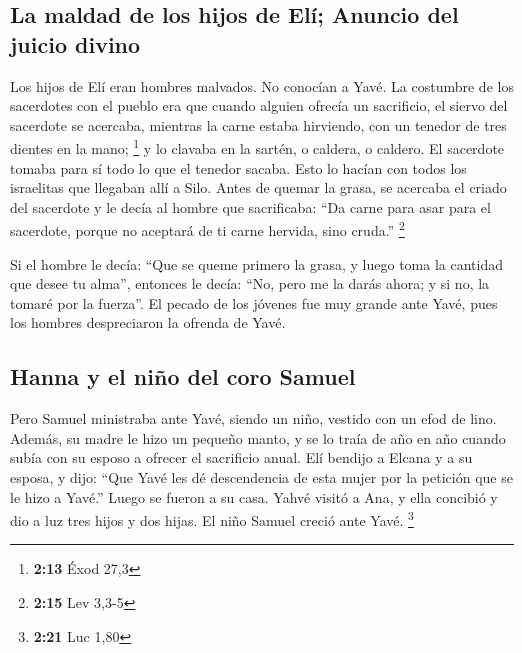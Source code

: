 \begin{paracol}{2}
\hypertarget{la-maldad-de-los-hijos-de-eluxed-anuncio-del-juicio-divino}{%
\subsection{La maldad de los hijos de Elí; Anuncio del juicio
divino}\label{la-maldad-de-los-hijos-de-eluxed-anuncio-del-juicio-divino}}

 Los hijos de Elí eran hombres malvados. No conocían a
Yavé.  La costumbre de los sacerdotes con el pueblo era
que cuando alguien ofrecía un sacrificio, el siervo del sacerdote se
acercaba, mientras la carne estaba hirviendo, con un tenedor de tres
dientes en la mano; \footnote{\textbf{2:13} Éxod 27,3}  y
lo clavaba en la sartén, o caldera, o caldero. El sacerdote tomaba para
sí todo lo que el tenedor sacaba. Esto lo hacían con todos los
israelitas que llegaban allí a Silo.  Antes de quemar la
grasa, se acercaba el criado del sacerdote y le decía al hombre que
sacrificaba: ``Da carne para asar para el sacerdote, porque no aceptará
de ti carne hervida, sino cruda.'' \footnote{\textbf{2:15} Lev 3,3-5}

 Si el hombre le decía: ``Que se queme primero la grasa,
y luego toma la cantidad que desee tu alma'', entonces le decía: ``No,
pero me la darás ahora; y si no, la tomaré por la fuerza''.
 El pecado de los jóvenes fue muy grande ante Yavé, pues
los hombres despreciaron la ofrenda de Yavé.

\hypertarget{hanna-y-el-niuxf1o-del-coro-samuel}{%
\subsection{Hanna y el niño del coro
Samuel}\label{hanna-y-el-niuxf1o-del-coro-samuel}}

 Pero Samuel ministraba ante Yavé, siendo un niño,
vestido con un efod de lino.  Además, su madre le hizo un
pequeño manto, y se lo traía de año en año cuando subía con su esposo a
ofrecer el sacrificio anual.  Elí bendijo a Elcana y a su
esposa, y dijo: ``Que Yavé les dé descendencia de esta mujer por la
petición que se le hizo a Yavé.'' Luego se fueron a su casa.
 Yahvé visitó a Ana, y ella concibió y dio a luz tres
hijos y dos hijas. El niño Samuel creció ante Yavé. \footnote{\textbf{2:21}
  Luc 1,80}

\hypertarget{las-suaves-amonestaciones-de-eluxed-a-sus-hijos-degenerados}{%
}
\end{paracol}

